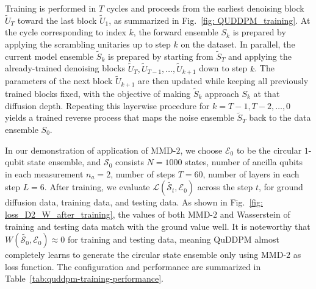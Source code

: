 \documentclass[aps,prx,reprint,superscriptaddress,amsmath,amssymb,longbibliography,floatfix]{revtex4-2}
\newcommand{\scE}{\mathcal{E}}
\newcommand{\scL}{\mathcal{L}}
\newcommand{\scS}{\mathcal{S}}
\theoremstyle{plain}
\theoremstyle{definition}
\theoremstyle{remark}
\begin{document}
Training is performed in $T$ cycles and proceeds from the earliest denoising block $\tilde U_T$ toward the last block $\tilde U_1$, as summarized in Fig.~\ref{fig: QUDDPM_training}. At the cycle corresponding to index $k$, the forward ensemble $S_k$ is prepared by applying the scrambling unitaries up to step $k$ on the dataset. In parallel, the current model ensemble $\tilde S_k$ is prepared by starting from $\tilde S_T$ and applying the already-trained denoising blocks $\tilde U_T,\tilde U_{T-1},\dots,\tilde U_{k+1}$ down to step $k$. The parameters of the next block $\tilde U_{k+1}$ are then updated while keeping all previously trained blocks fixed, with the objective of making $\tilde S_k$ approach $S_k$ at that diffusion depth. Repeating this layerwise procedure for $k=T-1,T-2,\dots,0$ yields a trained reverse process that maps the noise ensemble $\tilde S_T$ back to the data ensemble $S_0$.

In our demonstration of application of MMD-$2$, we choose $\scE_0$ to be the circular $1$-qubit state ensemble, and $\scS_0$ consists $N=1000$ states, number of ancilla qubits in each measurement $n_a=2$, number of steps $T=60$, number of layers in each step $L=6$. After training, we evaluate $\scL(\tilde{\scS_t}, \scE_0)$ across the step $t$, for ground diffusion data, training data, and testing data. As shown in Fig.~\ref{fig: loss_D2_W_after_training}, the values of both MMD-$2$ and Wasserstein of training and testing data match with the ground value well. It is noteworthy that $W(\tilde{\scS_0}, \scE_0) \approx 0$ for training and testing data, meaning QuDDPM almost completely learns to generate the circular state ensemble only using MMD-$2$ as loss function. The configuration and performance are summarized in Table~\ref{tab:quddpm-training-performance}.
\end{document}

